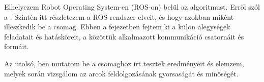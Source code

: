 Elhelyezem Robot Operating System-en (ROS-on) belül az algoritmust. Erről szól a . Szintén itt részletezem a ROS rendszer elveit, és hogy azokban miként illeszkedik be a csomag. Ebben a fejezetben fejtem ki a külön alegységek feladatait és hatásköreit, a közöttük alkalmazott kommunikáció csatornáit és formáit. 

Az utolsó, ben mutatom be a csomaghoz írt tesztek eredményeit és elemzem, melyek során vizsgálom az arcok feldolgozásának gyorsaságát és minőségét.

